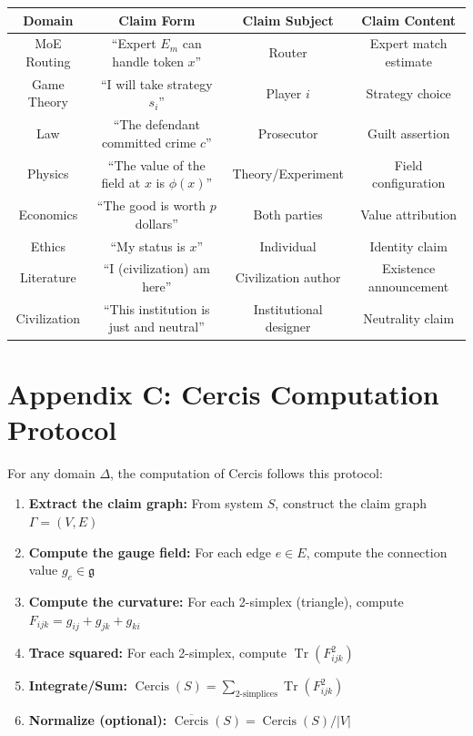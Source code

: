 \documentclass[12pt,a4paper]{article}
\theoremstyle{plain}
\theoremstyle{definition}
\newcommand{\Lie}{\mathfrak{g}}
\DeclareMathOperator{\Tr}{Tr}
\begin{document}
\begin{center}
\begin{tabular}{c|c|c|c}
    \toprule
    \textbf{Domain} & \textbf{Claim Form} & \textbf{Claim Subject} & \textbf{Claim Content} \\
    \midrule
    MoE Routing & ``Expert $E_m$ can handle token $x$'' & Router & Expert match estimate \\
    Game Theory & ``I will take strategy $s_i$'' & Player $i$ & Strategy choice \\
    Law & ``The defendant committed crime $c$'' & Prosecutor & Guilt assertion \\
    Physics & ``The value of the field at $x$ is $\phi(x)$'' & Theory/Experiment & Field configuration \\
    Economics & ``The good is worth $p$ dollars'' & Both parties & Value attribution \\
    Ethics & ``My status is $x$'' & Individual & Identity claim \\
    Literature & ``I (civilization) am here'' & Civilization author & Existence announcement \\
    Civilization & ``This institution is just and neutral'' & Institutional designer & Neutrality claim \\
    \bottomrule
\end{tabular}
\end{center}

\section{Appendix C: Cercis Computation Protocol}

For any domain $\Delta$, the computation of Cercis follows this protocol:

\begin{enumerate}[label=\textbf{Step \arabic*:}]
    \item \textbf{Extract the claim graph:} From system $S$, construct the claim graph $\Gamma = (V, E)$
    \item \textbf{Compute the gauge field:} For each edge $e \in E$, compute the connection value $g_e \in \Lie$
    \item \textbf{Compute the curvature:} For each 2-simplex (triangle), compute $F_{ijk} = g_{ij} + g_{jk} + g_{ki}$
    \item \textbf{Trace squared:} For each 2-simplex, compute $\Tr(F_{ijk}^2)$
    \item \textbf{Integrate/Sum:} $\operatorname{Cercis}(S) = \sum_{\text{2-simplices}} \Tr(F_{ijk}^2)$
    \item \textbf{Normalize (optional):} $\overline{\operatorname{Cercis}}(S) = \operatorname{Cercis}(S) / |V|$
\end{enumerate}
\end{document}

